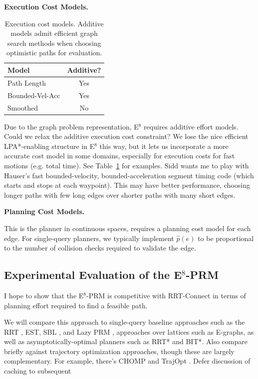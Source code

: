 \textbf{Execution Cost Models.}

\begin{table}
   \centering
   \begin{tabular}{lc}
      \toprule
      Model & Additive? \\
      \midrule
      Path Length & Yes \\
      Bounded-Vel-Acc & Yes \\
      Smoothed & No \\
      \bottomrule
   \end{tabular}
   \caption{Execution cost models.
      Additive models admit efficient graph search methods
      when choosing optimistic paths for evaluation.}
   \label{table:exec-cost-models}
\end{table}

Due to the graph problem representation,
E$^8$ requires additive effort models.
Could we relax the additive execution cost constraint?
We lose the nice efficient LPA*-enabling structure in
E$^8$ this way,
but it lets us incorporate a more accurate cost model in some domains,
especially for execution costs for fast motions (e.g. total time).
See Table~\ref{table:exec-cost-models} for examples.
Sidd wants me to play with Hauser's fast bounded-velocity,
bounded-acceleration segment timing code
(which starts and stops at each waypoint).
This may have better performance,
choosing longer paths with few long edges over
shorter paths with many short edges.

\textbf{Planning Cost Models.}

This is the planner in continuous spaces,
requires a planning cost model for each edge.
For single-query planners,
we typically implement $\hat{p}(e)$ to be
proportional to the number of collision checks required
to validate the edge.

\subsection{Experimental Evaluation of the E$^8$-PRM}
\label{subsec:single-query-results}

I hope to show that the E$^8$-PRM is competitive with RRT-Connect
in terms of planning effort required to find a feasible path.

We will compare this approach to
single-query baseline approaches
such as the RRT \cite{kuffner2000rrtconnect},
EST, SBL \cite{sanchezante2001sbl},
and Lazy PRM \cite{bohlin2000lazyprm},
approaches over lattices such as E-graphs,
as well as asymptotically-optimal planners such as
RRT* \cite{karaman2011samplingoptimal} and BIT*.
Also compare briefly against trajectory optimization approaches,
though these are largely complementary.
For example, there's CHOMP \cite{zucker2013chomp}
and TrajOpt \cite{schulman2013trajopt}.
Defer discussion of caching to subsequent

